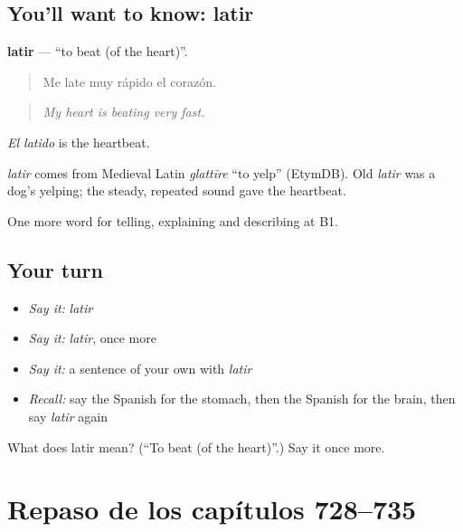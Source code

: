 \subsection*{You'll want to know: latir}
\textbf{latir} — \textquotedblleft{}to beat (of the heart)\textquotedblright{}.

\begin{quote}
Me late muy rápido el corazón.
\end{quote}

\begin{quote}
\emph{My heart is beating very fast.}
\end{quote}

\emph{El latido} is the heartbeat.

\begin{cousinweb}
\emph{latir} comes from Medieval Latin \emph{glattīre} \textquotedblleft{}to yelp\textquotedblright{} (EtymDB). Old \emph{latir} was a dog's yelping; the steady, repeated sound gave the heartbeat.
\end{cousinweb}

\begin{grammarlens}[title={What you've built}]
One more word for telling, explaining and describing at B1.
\end{grammarlens}

\subsection*{Your turn}
\begin{itemize}
\raggedright
  \item \emph{Say it:} \emph{latir}
  \item \emph{Say it:} \emph{latir}, once more
  \item \emph{Say it:} a sentence of your own with \emph{latir}
  \item \emph{Recall:} say the Spanish for the stomach, then the Spanish for the brain, then say \emph{latir} again
\end{itemize}

\begin{tcolorbox}[breakable,colback=teal!4,colframe=teal!35!black,title={Before you move on}]
What does latir mean? (\textquotedblleft{}To beat (of the heart)\textquotedblright{}.) Say it once more.
\end{tcolorbox}
\section[(dialogue)]{Repaso de los capítulos 728–735}

